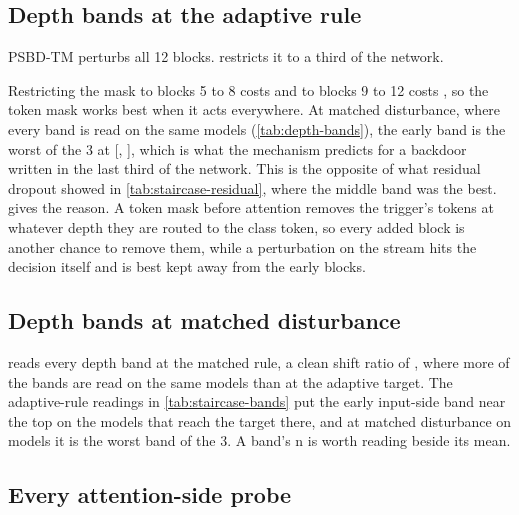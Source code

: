 



\subsection{Depth bands at the adaptive rule}
\label{sec:results:depth}

PSBD-TM perturbs all 12 blocks.  restricts it to a third of the network.



Restricting the mask to blocks 5 to 8 costs \StaircaseBandsBeforeAttentionNormBlocksFiveEightTokenMaskGain{} and to blocks 9 to 12 costs \StaircaseBandsBeforeAttentionNormBlocksNineOneTwoTokenMaskGain{}, so the token mask works best when it acts everywhere. At matched disturbance, where every band is read on the same models (\cref{tab:depth-bands}), the early band is the worst of the 3 at \BandOneFourMinusAllInputSide{} [\BandOneFourMinusAllInputSideLow{}, \BandOneFourMinusAllInputSideHigh{}], which is what the mechanism predicts for a backdoor written in the last third of the network. This is the opposite of what residual dropout showed in \cref{tab:staircase-residual}, where the middle band was the best.  gives the reason. A token mask before attention removes the trigger's tokens at whatever depth they are routed to the class token, so every added block is another chance to remove them, while a perturbation on the stream hits the decision itself and is best kept away from the early blocks.


\subsection{Depth bands at matched disturbance}
\label{app:bands}

 reads every depth band at the matched rule, a clean shift ratio of \PlacementMatchTarget{}, where more of the bands are read on the same models than at the adaptive target. The adaptive-rule readings in \cref{tab:staircase-bands} put the early input-side band near the top on the \StaircaseBandsBeforeAttentionNormBlocksOneFourTokenMaskN{} models that reach the target there, and at matched disturbance on \BandOneFourMinusAllInputSideN{} models it is the worst band of the 3. A band's n is worth reading beside its mean.


\FloatBarrier


\subsection{Every attention-side probe}
\label{app:attention}


